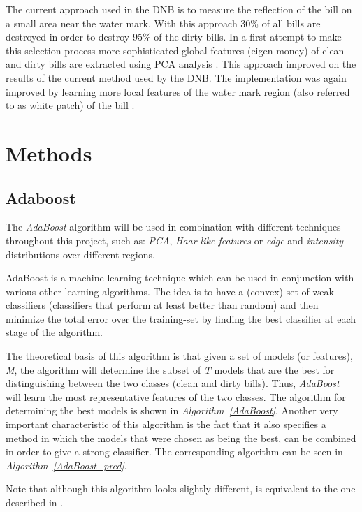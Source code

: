 \documentclass[11pt,twocolumn]{article}
\begin{document}
		The current approach used in the DNB is to measure the reflection of the bill on a small area near the water mark. With this approach 30\% of all bills are destroyed in order to destroy 95\% of the dirty bills. In a first attempt to make this selection process more		sophisticated global features (eigen-money) of clean and dirty bills are extracted using PCA analysis \cite{MoNuSt}. This approach improved on the results of the current method used by the DNB. The implementation was again improved by learning more local features of the water mark region (also referred to as white patch) of the bill \cite{Geusebroek}. 
	\section{Methods}\label{sec:Methods}
		\subsection{Adaboost}\label{sec:Adaboost}
			The \emph{AdaBoost} algorithm will be used in combination with different techniques throughout this project, such as: \emph{PCA}, \emph{Haar-like features} or \emph{edge} and \emph{intensity} distributions over different regions.

		AdaBoost is a machine learning technique which can be used in conjunction with various other learning algorithms. The idea is to have a (convex) set of weak classifiers (classifiers that perform at least better than random) and then minimize the total error over the training-set by finding the best classifier at each stage of the algorithm.

		The theoretical basis of this algorithm is that given a set of models (or features), \emph{M}, the algorithm will determine the subset of \emph{T} models that	 are the best for distinguishing between the two classes (clean and dirty bills). Thus, \emph{AdaBoost} will learn the most representative features of the two classes. The algorithm for determining the best models is shown in \emph{Algorithm~\ref{AdaBoost}}. Another very important characteristic of this algorithm is the fact that it also specifies a method in which the models that were chosen as being the best, can be combined in order to give a strong classifier. The corresponding algorithm can be seen in \emph{Algorithm~\ref{AdaBoost_pred}}. 

			Note that although this algorithm looks slightly different, is equivalent to the one described in \cite{Haar}.
			
\end{document}

